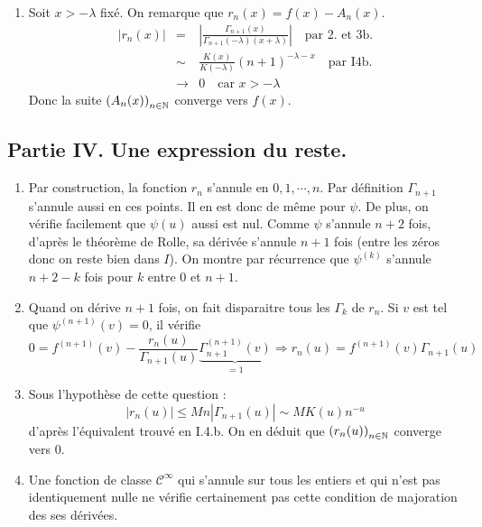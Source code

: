 \begin{enumerate}
\begin{enumerate}
\end{enumerate}
\item Soit $x> -\lambda$ fixé. On remarque que  $r_n(x)=f(x)- A_n(x)$.
\begin{eqnarray*}
\left|r_n(x)\right|&=&\left|\frac{\Gamma_{n+1}(x)}{\Gamma_{n+1}(-\lambda)(x+\lambda)}\right| \quad\text{par  2. et 3b.}\\
& \sim& \frac{K(x)}{K(-\lambda)}(n+1)^{-\lambda-x} \quad \text{par I4b.}\\
&\to& 0\quad\text{car } x> -\lambda
\end{eqnarray*}
Donc la suite $\left( A_n(x)\right)_{n\in \mathbb{N}}$  converge vers $f(x)$.
\end{enumerate}

\subsection*{Partie IV. Une expression du reste.}
\begin{enumerate}
 \item Par construction, la fonction $r_n$ s'annule en $0,1,\cdots,n$. Par définition $\Gamma_{n+1}$ s'annule aussi en ces points. Il en est donc de même pour $\psi$. De plus, on vérifie facilement que $\psi(u)$ aussi est nul. Comme $\psi$ s'annule $n+2$ fois, d'après le théorème de Rolle, sa dérivée s'annule $n+1$ fois (entre les zéros donc on reste bien dans $I$). On montre par récurrence que $\psi^{(k)}$ s'annule $n+2-k$ fois pour $k$ entre $0$ et $n+1$.

\item Quand on dérive $n+1$ fois, on fait disparaitre tous les $\Gamma_k$ de $r_n$. Si $v$ est tel que $\psi^{(n+1)}(v)=0$, il vérifie
\begin{displaymath}
 0 = f^{(n+1)}(v) - \frac{r_n(u)}{\Gamma_{n+1}(u)}\underset{=1}{\underbrace{\Gamma_{n+1}^{(n+1)}(v)}}
\Rightarrow
r_n(u) = f^{(n+1)}(v) \Gamma_{n+1}(u)
\end{displaymath}

\item Sous l'hypothèse de cette question :
\begin{displaymath}
 \left| r_n(u)\right| \leq M n \left|\Gamma_{n+1}(u)\right|\sim M K(u)n^{-u}
\end{displaymath}
d'après l'équivalent trouvé en I.4.b. On en déduit que $\left( r_n(u)\right) _{n\in \mathbb{N}}$ converge vers $0$.

\item Une fonction de classe $\mathcal{C}^{\infty}$ qui s'annule sur tous les entiers et qui n'est pas identiquement nulle ne vérifie certainement pas cette condition de majoration des ses dérivées.  
\end{enumerate}


